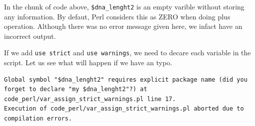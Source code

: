 \documentclass[]{book}
\makeatletter
\newenvironment{Shaded}{\begin{snugshade}}{\end{snugshade}}
\newcommand{\CharTok}[1]{\textcolor[rgb]{0.31,0.60,0.02}{#1}}
\newcommand{\CommentTok}[1]{\textcolor[rgb]{0.56,0.35,0.01}{\textit{#1}}}
\newcommand{\DataTypeTok}[1]{\textcolor[rgb]{0.13,0.29,0.53}{#1}}
\newcommand{\FunctionTok}[1]{\textcolor[rgb]{0.00,0.00,0.00}{#1}}
\newcommand{\KeywordTok}[1]{\textcolor[rgb]{0.13,0.29,0.53}{\textbf{#1}}}
\newcommand{\NormalTok}[1]{#1}
\newcommand{\StringTok}[1]{\textcolor[rgb]{0.31,0.60,0.02}{#1}}
\newenvironment{kframe}{%
\medskip{}
\setlength{\fboxsep}{.8em}
 \def\at@end@of@kframe{}%
 \ifinner\ifhmode%
  \def\at@end@of@kframe{\end{minipage}}%
  \begin{minipage}{\columnwidth}%
 \fi\fi%
 \def\FrameCommand##1{\hskip\@totalleftmargin \hskip-\fboxsep
 \colorbox{shadecolor}{##1}\hskip-\fboxsep
     \hskip-\linewidth \hskip-\@totalleftmargin \hskip\columnwidth}%
 \MakeFramed {\advance\hsize-\width
   \@totalleftmargin\z@ \linewidth\hsize
   \@setminipage}}%
 {\par\unskip\endMakeFramed%
 \at@end@of@kframe}
\renewenvironment{Shaded}{\begin{kframe}}{\end{kframe}}
\makeatother
\begin{document}
In the chunk of code above, \texttt{\$dna\_lenght2} is an empty varible without storing any information. By defaut, Perl considers this as ZERO when doing plus operation. Although there was no error message given here, we infact have an incorrect output.

If we add \texttt{use\ strict} and \texttt{use\ warnings}, we need to decare each variable in the script. Let us see what will happen if we have an typo.

\begin{Shaded}
\end{Shaded}

\begin{verbatim}
Global symbol "$dna_lenght2" requires explicit package name (did you forget to declare "my $dna_lenght2"?) at code_perl/var_assign_strict_warnings.pl line 17.
Execution of code_perl/var_assign_strict_warnings.pl aborted due to compilation errors.
\end{verbatim}
\end{document}

